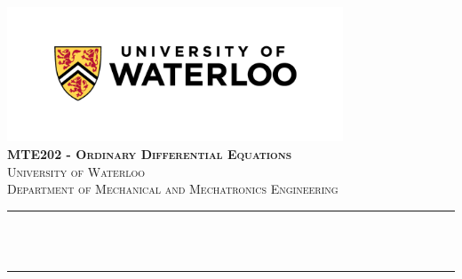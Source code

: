 \begin{titlepage}

\newcommand{\HRule}{\rule{\linewidth}{0.5mm}} %





\begin{center} %


\includegraphics[width = 10cm]{./figures/uw}\\[1.5cm] 
\textbf{\textsc{\Large MTE202 - Ordinary Differential Equations}}\\[1.0cm] 
\textsc{\Large University of Waterloo}\\[0.5cm] 
\textsc{\large Department of Mechanical and Mechatronics Engineering}\\[0.95cm] 


\HRule \\[0.4cm]
{ \huge \bfseries \reporttitle}\\ %
\HRule \\[1.5cm]
\end{center}


\end{titlepage}

